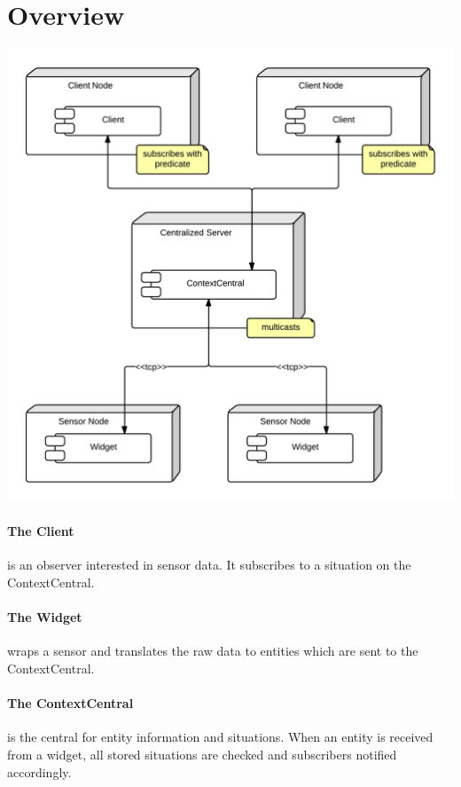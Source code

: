 \documentclass[]{report}
\begin{document}
\section{Overview}

\begin{center}
\includegraphics[scale=0.2]{ComponentDiagram.png}
\end{center}


\paragraph{The Client} is an observer interested in sensor data. It subscribes to a situation on the ContextCentral.

\paragraph{The Widget} wraps a sensor and translates the raw data to entities which are sent to the ContextCentral.

\paragraph{The ContextCentral} is the central for entity information and situations. When an entity is received from a widget, all stored situations are checked and subscribers notified accordingly.
\end{document}

